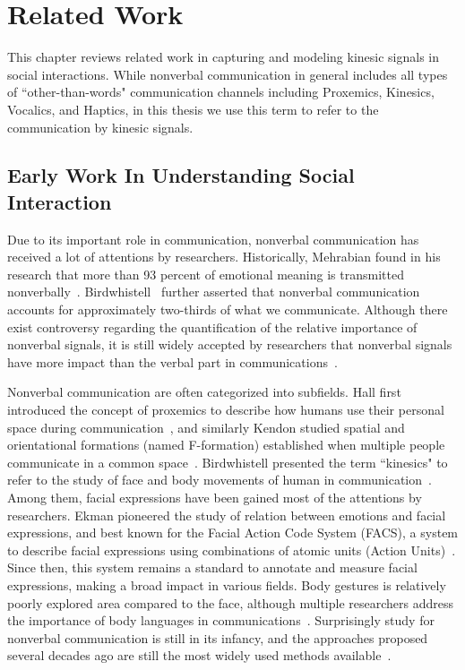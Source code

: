 
\chapter{Related Work}

This chapter reviews related work in capturing and modeling kinesic signals in social interactions. While nonverbal communication in general includes all types of ``other-than-words" communication channels including Proxemics, Kinesics, Vocalics, and Haptics, in this thesis we use this term to refer to the communication by kinesic signals. 

\section{Early Work In Understanding Social Interaction}

Due to its important role in communication, nonverbal communication has received a lot of attentions by researchers. Historically, Mehrabian found in his research that more than 93 percent of emotional meaning is transmitted nonverbally~\cite{Mehrabian67,Mehrabian81}. Birdwhistell~\cite{Birdwhistell70} further asserted that nonverbal communication accounts for approximately two-thirds of what we communicate. Although there exist controversy regarding the quantification of the relative importance of nonverbal signals, it is still widely accepted by researchers that nonverbal signals have more impact than the verbal part in communications~\cite{Moore13}.

Nonverbal communication are often categorized into subfields. Hall first introduced the concept of proxemics to describe how humans use their personal space during communication~\cite{Hall66}, and similarly Kendon studied spatial and orientational formations (named F-formation) established when multiple people communicate in a common space~\cite{kendon90}. Birdwhistell presented the term ``kinesics" to refer to the study of face and body movements of human in communication~\cite{Birdwhistell52, ekman1969}. Among them, facial expressions have been gained most of the attentions by researchers. Ekman pioneered the study of relation between emotions and facial expressions, and best known for the Facial Action Code System (FACS), a system to describe facial expressions using combinations of atomic units (Action Units)~\cite{ekman1977facial}. Since then, this system remains a standard to annotate and measure facial expressions, making a broad impact in various fields. Body gestures is relatively poorly explored area compared to the face, although multiple researchers address the importance of body languages in communications~\cite{Gelder09, Moore13, Meeren-2005, Aviezer-2012}. Surprisingly study for nonverbal communication is still in its infancy, and the approaches proposed several decades ago are still the most widely used methods available~\cite{Moore13}. 

